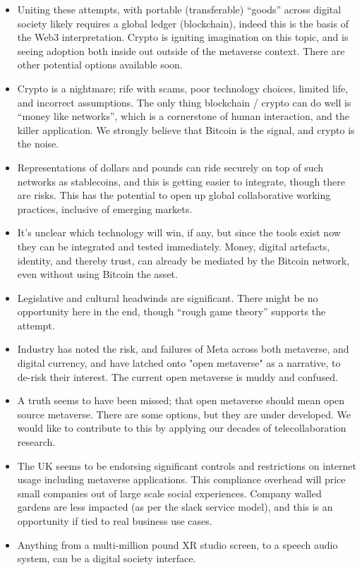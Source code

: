 \begin{itemize}
\item Uniting these attempts, with portable (transferable) ``goods'' across digital society likely requires a global ledger (blockchain), indeed this is the basis of the Web3 interpretation. Crypto is igniting imagination on this topic, and is seeing adoption both inside out outside of the metaverse context. There are other potential options available soon.
\item Crypto is a nightmare; rife with scams, poor technology choices, limited life, and incorrect assumptions. The only thing blockchain / crypto can do well is ``money like networks'', which is a cornerstone of human interaction, and the killer application. We strongly believe that Bitcoin is the signal, and crypto is the noise.
\item Representations of dollars and pounds can ride securely on top of such networks as stablecoins, and this is getting easier to integrate, though there are risks. This has the potential to open up global collaborative working practices, inclusive of emerging markets.
\item It's unclear which technology will win, if any, but since the tools exist now they can be integrated and tested immediately. Money, digital artefacts, identity, and thereby trust, can already be mediated by the Bitcoin network, even without using Bitcoin the asset. 
\item Legislative and cultural headwinds are significant. There might be no opportunity here in the end, though ``rough game theory'' supports the attempt.
\item Industry has noted the risk, and failures of Meta across both metaverse, and digital currency, and have latched onto "open metaverse" as a narrative, to de-risk their interest. The current open metaverse is muddy and confused. 
\item A truth seems to have been missed; that open metaverse should mean open source metaverse. There are some options, but they are under developed. We would like to contribute to this by applying our decades of telecollaboration research. 
\item The UK seems to be endorsing significant controls and restrictions on internet usage including metaverse applications. This compliance overhead will price small companies out of large scale social experiences. Company walled gardens are less impacted (as per the slack service model), and this is an opportunity if tied to real business use cases.
\item Anything from a multi-million pound XR studio screen, to a speech audio system, can be a digital society interface.

\end{itemize}
